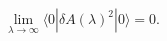 \begin{equation}
\lim_{\lambda \rightarrow \infty} \langle 0| \delta A(\lambda)^2 
|0 \rangle 
=0. 
\label{limitscalar}
\end{equation}

